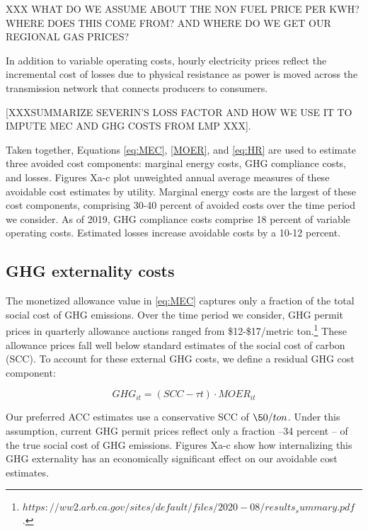 \documentclass[11pt]{article}
\begin{document}
XXX WHAT DO WE ASSUME ABOUT THE NON FUEL PRICE PER KWH? WHERE DOES THIS COME FROM? AND WHERE DO WE GET OUR REGIONAL GAS PRICES?

In addition to variable operating costs, hourly electricity prices reflect the  incremental cost of losses due to physical resistance as power is moved across the transmission network that connects producers to consumers.

 [XXXSUMMARIZE SEVERIN'S LOSS FACTOR AND HOW WE USE IT TO IMPUTE MEC AND GHG COSTS FROM LMP XXX].

Taken together, Equations \ref{eq:MEC}, \ref{MOER}, and \ref{eq:HR} are used to estimate three avoided cost components: marginal energy costs, GHG compliance costs, and losses. Figures Xa-c plot unweighted annual average measures of these avoidable cost estimates by utility. Marginal energy costs are the largest of these cost components, comprising 30-40 percent of avoided costs over the time period we consider.  As of 2019, GHG compliance costs comprise 18 percent of variable operating costs. Estimated losses increase avoidable costs by a 10-12 percent.

\subsection{GHG externality costs}

The monetized allowance value in \ref{eq:MEC} captures only a fraction of the total social cost of GHG emissions. Over the time period we consider, GHG permit prices in quarterly allowance auctions ranged from \$12-\$17/metric ton.\footnote{$ https://ww2.arb.ca.gov/sites/default/files/2020-08/results_summary.pdf$.}  These allowance prices fall well below standard estimates of the social cost of carbon (SCC). To account for these external GHG costs, we define a residual GHG cost component:

\begin{center}
\begin{equation*}
GHG_{it}= (SCC-\tau{t})\cdot MOER_{it}
\end{equation*}
\end{center}

Our preferred ACC estimates use a conservative SCC of $\50/ton$. Under this assumption, current GHG permit prices reflect only a fraction --34 percent -- of the true social cost of GHG emissions. Figures Xa-c  show how internalizing this GHG externality has an economically significant effect on our avoidable cost estimates. 
\end{document}
